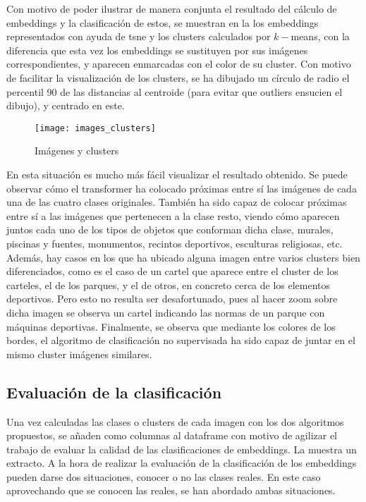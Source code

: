				Con motivo de poder ilustrar de manera conjunta el resultado del cálculo de embeddings y la clasificación de estos, se muestran en la  los embeddings representados con ayuda de \gls{tsne} y los clusters calculados por $k-$means, con la diferencia que esta vez los embeddings se sustituyen por sus imágenes correspondientes, y aparecen enmarcadas con el color de su cluster. Con motivo de facilitar la visualización de los clusters, se ha dibujado un círculo de radio el percentil 90 de las distancias al centroide (para evitar que outliers ensucien el dibujo), y centrado en este. \\
				
				\begin{figure}[!h]
					\centering
					\texttt{[image: images\_clusters]}
					\caption{Imágenes y clusters}
					\label{fig:embeddings_visuales}
				\end{figure} 
				
				En esta situación es mucho más fácil visualizar el resultado obtenido. Se puede observar cómo el transformer ha colocado próximas entre sí las imágenes de cada una de las cuatro clases originales. También ha sido capaz de colocar próximas entre sí a las imágenes que pertenecen a la clase resto, viendo cómo aparecen juntos cada uno de los tipos de objetos que conforman dicha clase, murales, piscinas y fuentes, monumentos, recintos deportivos, esculturas religiosas, etc. Además, hay casos en los que ha ubicado alguna imagen entre varios clusters bien diferenciados, como es el caso de un cartel que aparece entre el cluster de los carteles, el de los parques, y el de otros, en concreto cerca de los elementos deportivos. Pero esto no resulta ser desafortunado, pues al hacer zoom sobre dicha imagen se observa un cartel indicando las normas de un parque con máquinas deportivas. Finalmente, se observa que mediante los colores de los bordes, el algoritmo de clasificación no supervisada ha sido capaz de juntar en el mismo cluster imágenes similares. 
				
			\subsection{Evaluación de la clasificación}
			
				Una vez calculadas las clases o clusters de cada imagen con los dos algoritmos propuestos, se añaden como columnas al dataframe con motivo de agilizar el trabajo de evaluar la calidad de las clasificaciones de embeddings. La  muestra un extracto. A la hora de realizar la evaluación de la clasificación de los embeddings pueden darse dos situaciones, conocer o no las clases reales. En este caso aprovechando que se conocen las reales, se han abordado ambas situaciones.
			
